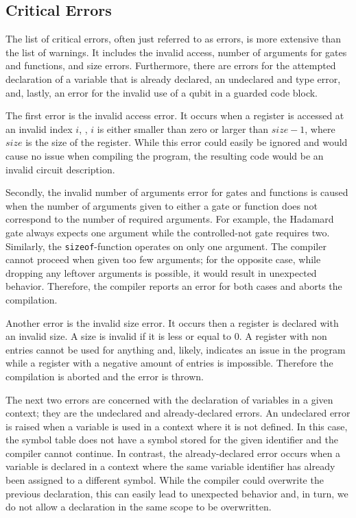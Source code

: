 \subsection{Critical Errors}
The list of critical errors, often just referred to as errors, is more extensive than the list of warnings. It includes the invalid access, number of arguments for gates and functions, and size errors. Furthermore, there are errors for the attempted declaration of a variable that is already declared, an undeclared and type error, and, lastly, an error for the invalid use of a qubit in a guarded code block.

The first error is the invalid access error. It occurs when a register is accessed at an invalid index $i$, \ie, $i$ is either smaller than zero or larger than $size - 1$, where $size$ is the size of the register. While this error could easily be ignored and would cause no issue when compiling the program, the resulting code would be an invalid circuit description. 

Secondly, the invalid number of arguments error for gates and functions is caused when the number of arguments given to either a gate or function does not correspond to the number of required arguments. For example, the Hadamard gate always expects one argument while the controlled-not gate requires two. Similarly, the \texttt{sizeof}-function operates on only one argument. The compiler cannot proceed when given too few arguments; for the opposite case, while dropping any leftover arguments is possible, it would result in unexpected behavior. %
Therefore, the compiler reports an error for both cases and aborts the compilation.

Another error is the invalid size error. It occurs then a register is declared with an invalid size. A size is invalid if it is less or equal to $0$. A register with non entries cannot be used for anything and, likely, indicates an issue in the program while a register with a negative amount of entries is impossible. Therefore the compilation is aborted and the error is thrown.

The next two errors are concerned with the declaration of variables in a given context; they are the undeclared and already-declared errors. An undeclared error is raised when a variable is used in a context where it is not defined. In this case, the symbol table does not have a symbol stored for the given identifier and the compiler cannot continue. In contrast, the already-declared error occurs when a variable is declared in a context where the same variable identifier has already been assigned to a different symbol. While the compiler could overwrite the previous declaration, this can easily lead to unexpected behavior and, in turn, we do not allow a declaration in the same scope to be overwritten. 

